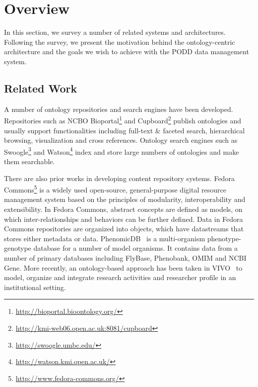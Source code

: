 \documentclass{llncs}
\begin{document}
\section{Overview}\label{sec:overview}
In this section, we survey a number of related systems and
architectures. Following the survey, we present the motivation behind
the ontology-centric architecture and the goals we wish to achieve with
the PODD data management system.

\subsection{Related Work}
A number of ontology repositories and search engines have been
developed. Repositories such as NCBO
Bioportal\footnote{\url{http://bioportal.bioontology.org/}} and
Cupboard\footnote{\url{http://kmi-web06.open.ac.uk:8081/cupboard}}
publish ontologies and usually support functionalities including
full-text \& faceted search, hierarchical browsing, visualization and
cross references. Ontology search engines such as
Swoogle\footnote{\url{http://swoogle.umbc.edu/}} and
Watson\footnote{\url{http://watson.kmi.open.ac.uk/}} index and store
large numbers of ontologies and make them searchable.

There are also prior works in developing content repository systems.
Fedora Commons\footnote{\url{http://www.fedora-commons.org/}} 
is a widely used open-source, general-purpose digital resource 
management system based on the principles
of modularity, interoperability and extensibility. In Fedora Commons,
abstract concepts are defined as models, on which inter-relationships
and behaviors can be further defined. Data in Fedora Commons
repositories are organized into objects, which have datastreams that
stores either metadata or data. PhenomicDB~\cite{citeulike:1036090} 
is a multi-organism phenotype-genotype 
database for a number of model organisms. It contains data from a number of 
primary databases including FlyBase, Phenobank, OMIM and NCBI Gene.
More recently, an ontology-based approach has been taken in
VIVO~\cite{vivo_websci} to model, organize and integrate research
activities and researcher profile in an institutional setting.
\end{document}
